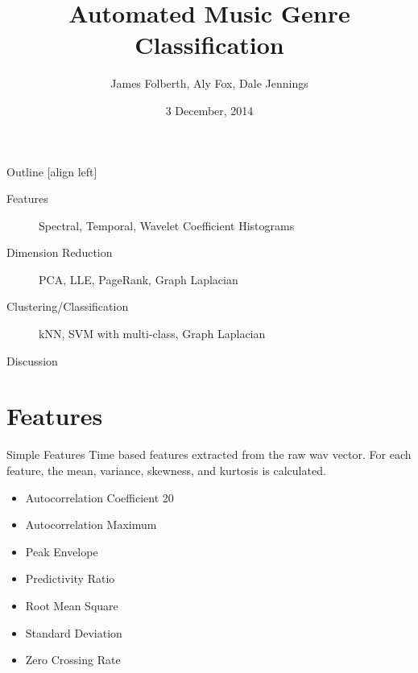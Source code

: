 \documentclass[xcolor=dvipsnames,t]{beamer} %
\title{Automated Music Genre Classification}
\date{3 December, 2014}
\author{James Folberth, Aly Fox, Dale Jennings}
\begin{document}
\begin{frame}
\maketitle
\end{frame}


\begin{frame}{Outline}
   [align left] %
   \begin{description}                              %
      \item[Features] Spectral, Temporal, Wavelet Coefficient Histograms\\
      \item[Dimension Reduction] PCA, LLE, PageRank, Graph Laplacian\\
      \item[Clustering/Classification] kNN, SVM with multi-class, Graph Laplacian\\
      \item[Discussion]
   \end{description}

\end{frame}

\section{Features}
\begin{frame}{Simple Features}
Time based features extracted from the raw wav vector.  For each feature, the mean, variance, skewness, and kurtosis is calculated.
\begin{itemize}
\item Autocorrelation Coefficient 20
\item Autocorrelation Maximum
\item Peak Envelope
\item Predictivity Ratio
\item Root Mean Square
\item Standard Deviation
\item Zero Crossing Rate
\end{itemize}
\end{frame}
\end{document}
